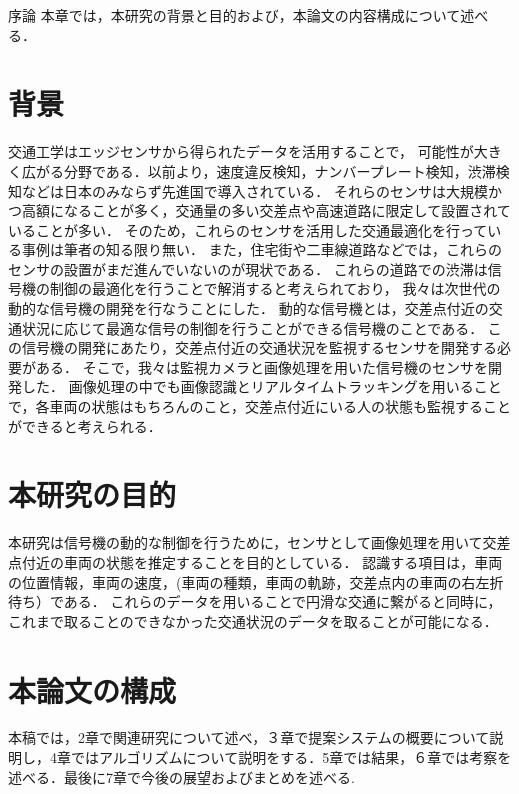 \chapterhead
{序論}
{本章では，本研究の背景と目的および，本論文の内容構成について述べる．}

\section{背景}
交通工学はエッジセンサから得られたデータを活用することで，
可能性が大きく広がる分野である．以前より，速度違反検知，ナンバープレート検知，渋滞検知などは日本のみならず先進国で導入されている．
それらのセンサは大規模かつ高額になることが多く，交通量の多い交差点や高速道路に限定して設置されていることが多い．
そのため，これらのセンサを活用した交通最適化を行っている事例は筆者の知る限り無い．
また，住宅街や二車線道路などでは，これらのセンサの設置がまだ進んでいないのが現状である．
これらの道路での渋滞は信号機の制御の最適化を行うことで解消すると考えられており，
我々は次世代の動的な信号機の開発を行なうことにした．
動的な信号機とは，交差点付近の交通状況に応じて最適な信号の制御を行うことができる信号機のことである．
この信号機の開発にあたり，交差点付近の交通状況を監視するセンサを開発する必要がある．
そこで，我々は監視カメラと画像処理を用いた信号機のセンサを開発した．
画像処理の中でも画像認識とリアルタイムトラッキングを用いることで，各車両の状態はもちろんのこと，交差点付近にいる人の状態も監視することができると考えられる．%

\section{本研究の目的}
本研究は信号機の動的な制御を行うために，センサとして画像処理を用いて交差点付近の車両の状態を推定することを目的としている．
認識する項目は，車両の位置情報，車両の速度，(車両の種類，車両の軌跡，交差点内の車両の右左折待ち）である．%
これらのデータを用いることで円滑な交通に繋がると同時に，これまで取ることのできなかった交通状況のデータを取ることが可能になる．

\section{本論文の構成}
本稿では，2章で関連研究について述べ，３章で提案システムの概要について説明し，4章ではアルゴリズムについて説明をする．5章では結果，６章では考察を述べる．最後に7章で今後の展望およびまとめを述べる.


\newpage
